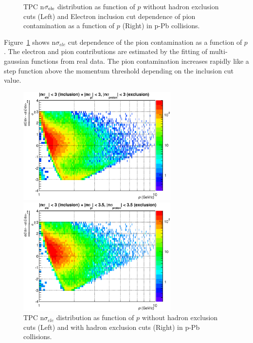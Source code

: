 {\begin{figure}[!h]
\begin{minipage}{0.5\hsize}
\begin{center}
    \end{center}
 \end{minipage}
  \caption{TPC n$\sigma_{\rm{ele}}$ distribution as function of $p$ without hadron exclusion cuts (Left)  and 
	  Electron inclusion cut dependence of pion contamination as a function of $p$ (Right) in p-Pb collisions.	
   }
  \label{fig_4_tpcinclusion}
\end{figure}
Figure~\ref{fig_4_tpcinclusion} shows n$\sigma_{ele}$ cut dependence of the pion contamination as a function of $p$. 
The electron and pion contributions are estimated by the fitting of multi-gaussian functions from real data. 
The pion contamination increases rapidly like a step function above the momentum threshold depending on the inclusion cut value.
\begin{figure}[htbp]
 \begin{minipage}{0.5\hsize}
  \begin{center}
  \includegraphics[width=8cm]{chap4/figure/PID/TPCNsigmaElevsp_Selected_ex3.eps}
  \end{center}
 \end{minipage}
 \begin{minipage}{0.5\hsize}
  \begin{center}
  \includegraphics[width=8cm]{chap4/figure/PID/TPCNsigmaElevsp_Selected_ex3p5.eps}
  \end{center}
 \end{minipage}
  \caption{TPC n$\sigma_{ele}$ distribution as function of $p$ without hadron exclusion cuts (Left) and with hadron exclusion cuts (Right) in p-Pb collisions.}
  \label{fig_4_tpcnsigmawex}
\end{figure}

}
